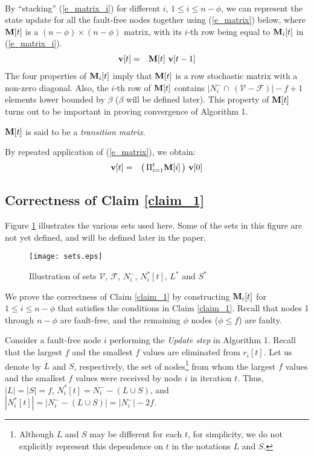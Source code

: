 \documentclass[letterpaper, 12pt]{article}
\newcommand{\scriptf}{\mathcal{F}}
\newcommand{\scriptv}{\mathcal{V}}
\begin{document}
~



By ``stacking'' (\ref{e_matrix_i}) for different
$i$, $1\leq i\leq n-\phi$, we can
represent the state update for all the fault-free nodes together
using (\ref{e_matrix})
below, where ${\bf M}[t]$ is a $(n-\phi)\times (n-\phi)$ matrix, with its $i$-th row
being equal to ${\bf M}_i[t]$ in (\ref{e_matrix_i}).
\begin{eqnarray}
{{\bf v}}[t] & = & {\bf M}[t] ~ {{\bf v}}[t-1]
\label{e_matrix}
\end{eqnarray}
The four properties of ${\bf M}_i[t]$ imply that ${\bf M}[t]$ is a
row stochastic matrix with a non-zero diagonal.
Also, the $i$-th row of ${\bf M}[t]$ contains $|N_i^-\cap\,(\scriptv-\scriptf)| - f+1$
elements lower bounded by $\beta$ ($\beta$ will be defined later).
This property of ${\bf M}[t]$ turns out to be important in proving
convergence of Algorithm 1.

${\bf M}[t]$ is said to be a {\em transition matrix}.

By repeated application of (\ref{e_matrix}), we obtain:
\begin{eqnarray*}
{\bf v}[t] & = & \left(\,\Pi_{i=1}^t {\bf M}[i]\,\right)\, {\bf v}[0]
\end{eqnarray*}








\subsection{Correctness of Claim \ref{claim_1}}
\label{ss_claim_1}

Figure \ref{f_sets} illustrates the various sets used here.
Some of the sets in this figure are not yet defined, and will be defined
later in the paper.
\begin{figure}
\centering
\texttt{[image: sets.eps]}
\caption{Illustration of sets $\scriptv$, $\scriptf$, $N_i^-$,
$N_i^*[t]$, $L^*$ and $S^*$}
\label{f_sets}
\end{figure}



We prove the correctness of Claim \ref{claim_1} by constructing ${\bf M}_i[t]$
for $1\leq i\leq n-\phi$ that satisfies the conditions in Claim \ref{claim_1}.
Recall that nodes 1 through $n-\phi$ are fault-free, and the remaining
$\phi$ nodes ($\phi\leq f$) are faulty.

Consider a fault-free node $i$ performing the {\em Update step}
in Algorithm 1.
Recall that the largest $f$ and the smallest $f$ values are eliminated
from $r_i[t]$. Let us denote by $L$ and $S$, respectively, the set
of nodes\footnote{Although $L$ and $S$ may be different for each $t$,
for simplicity, we do not explicitly represent this dependence
on $t$ in the notations $L$ and $S$.}  
from whom the largest $f$ values and the smallest $f$ values
were received by node $i$ in iteration $t$.
Thus,
$|L|=|S|=f$, $N_i^*[t] = N_i^- - (L\cup S)$,
and $|N_i^*[t]|=|N_i^--(L\cup S)| = |N_i^-|-2f$.
\end{document}

